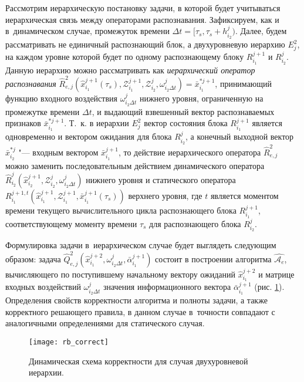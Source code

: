 Рассмотрим иерархическую постановку задачи, в которой будет учитываться иерархическая связь между операторами распознавания. Зафиксируем, как и в~динамическом случае, промежуток времени $\Delta t=[\tau_s,\tau_s+h_{i_2}^j)$. Далее, будем рассматривать не единичный распознающий блок, а двухуровневую иерархию $E_j^2$, на каждом уровне которой будет по одному распознающему блоку $R_{i_1}^{j+1}$ и $R_{i_2}^j$. Данную иерархию можно рассматривать как \textit{иерархический оператор распознавания} $\hat R_{e,j}^2(\hat x_{i_1}^{j+1}(\tau_s),\mathcal Z_{i_1}^{j+1},\mathcal Z_{i_2}^j,\omega_{i_2\Delta t}^j)=\bar x_{i_1}^{*j+1}$, принимающий функцию входного воздействия $\omega_{i_2\Delta t}^j$ нижнего уровня, ограниченную на промежутке времени $\Delta t$, и выдающий взвешенный вектор распознаваемых признаков $\bar x_{i_1}^{*j+1}$. Т.~к. в иерархии $E_j^2$ вектор состояния блока $R_{i_1}^{j+1}$ является одновременно и вектором ожидания для блока $R_{i_2}^j$, а конечный выходной вектор $\bar x_{i_2}^{*j}$ "--- входным вектором $\bar x_{i_1}^{j+1}$, то действие иерархического оператора $\hat R_{e,j}^2$ можно заменить последовательным действием динамического оператора $\hat R_{i_2}^j(\hat x _{i_2}^{j+1},\mathcal Z_{i_2}^j,\omega_{i_2\Delta t}^j)$ нижнего уровня и статического оператора $R_{i_1}^{j+1,t}(\hat x _{i_1}^{j+1},\mathcal Z_{i_1}^{j+1},\bar x_{i_1}^{j+1}(\tau_s))$ верхнего уровня, где $t$ является моментом времени текущего вычислительного цикла распознающего блока $R_{i_1}^{j+1}$, соответствующему моменту времени $\tau_s$ для распознающего блока $R_{i_2}^j$.

Формулировка задачи в~иерархическом случае будет выглядеть следующим образом: задача $\hat Q_{e,j}^2(\hat x_{i_1}^{j+2},\omega_{i_2\Delta t}^j,\bar\alpha_{i_1}^{j+1})$ состоит в построении алгоритма $\hat{\mathcal A_e}$, вычисляющего по поступившему начальному вектору ожиданий $\hat x_{i_1}^{j+2}$ и матрице входных воздействий $\omega_{i_2\Delta t}^j$ значения информационного вектора $\bar\alpha_{i_1}^{j+1}$ (рис. \ref{fig:rb_correct_hier}). Определения свойств корректности алгоритма и полноты задачи, а также корректного решающего правила, в данном случае в~точности совпадают с аналогичными определениями для статического случая.

\begin{figure}[h]
	\centering
	\texttt{[image: rb\_correct]}
	\caption{Динамическая схема корректности для случая двухуровневой иерархии.}
	\label{fig:rb_correct_hier}
\end{figure}


